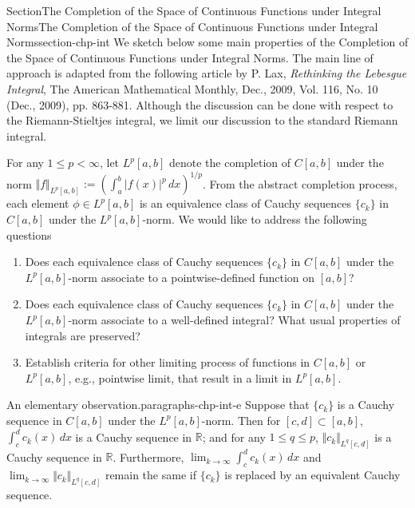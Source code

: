 \documentclass[oneside,10pt,]{article}
\numberwithin{equation}{section}
\newcommand{\bbR}{\mathbb{R}}
\begin{document}
\begin{sectionptx}{Section}{The Completion of the Space of Continuous Functions under Integral Norms}{}{The Completion of the Space of Continuous Functions under Integral Norms}{}{}{section-chp-int}
We sketch below some main properties of  the Completion of the Space of Continuous Functions under Integral Norms. The main line of approach is adapted from the following article by P. Lax, \emph{Rethinking the Lebesgue Integral}, The American Mathematical Monthly, Dec., 2009, Vol. 116, No. 10 (Dec., 2009), pp. 863-881. Although the discussion can be done with respect to the Riemann-Stieltjes integral, we limit our discussion to the standard Riemann integral.%
\par
For any \(1\le p < \infty\), let \(L^{p}[a,  b]\) denote the completion of \(C[a, b]\) under the norm \(\Vert f \Vert_{L^{p}[a, b]} :=\left( \int_{a}^{b} |f(x)|^{p}\, dx\right)^{1/p}\). From the abstract completion process, each element \(\phi\in L^{p}[a,  b]\) is an equivalence class of Cauchy sequences \(\{ c_{k}\}\) in \(C[a, b]\) under the \(L^{p}[a,  b]\)-norm. We would like to address the following questions%
\par
%
\begin{enumerate}[label=\alph*.]
\item{}Does each equivalence class of Cauchy sequences \(\{ c_{k}\}\) in \(C[a, b]\) under the \(L^{p}[a,  b]\)-norm associate to a pointwise-defined function on \([a, b]\)?%
\item{}Does each equivalence class of Cauchy sequences \(\{ c_{k}\}\) in \(C[a, b]\) under the \(L^{p}[a,  b]\)-norm associate to a well-defined integral? What usual properties of integrals are preserved?%
\item{}Establish criteria for other limiting process of functions in \(C[a, b]\) or \(L^{p}[a,  b]\), e.g., pointwise limit, that result in a limit in \(L^{p}[a,  b]\).%
\end{enumerate}
%
\begin{paragraphs}{An elementary observation.}{paragraphs-chp-int-e}%
 Suppose that \(\{ c_{k}\}\) is a Cauchy sequence in \(C[a, b]\) under the \(L^{p}[a,  b]\)-norm. Then for \([c, d]\subset [a, b]\), \(\int_{c}^{d} c_{k}(x)\, dx\) is a Cauchy sequence in \(\bbR\); and for any \(1\le q \le p\), \(\Vert c_{k} \Vert_{L^{q}[c,d]}\)  is a Cauchy sequence in \(\bbR\). Furthermore, \(\lim_{k\to\infty} \int_{c}^{d} c_{k}(x)\, dx\) and \(\lim_{k\to\infty}\Vert c_{k} \Vert_{L^{q}[c,d]}\) remain the same if \(\{ c_{k}\}\) is replaced by an equivalent Cauchy sequence.\end{paragraphs}%

\end{sectionptx}
\end{document}
